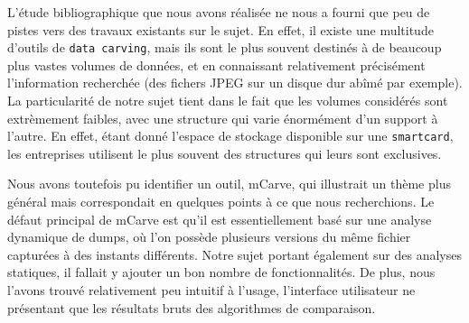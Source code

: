L'étude bibliographique que nous avons réalisée ne nous a fourni que peu de pistes vers des travaux existants sur le sujet. En effet, il existe une multitude d'outils de \texttt{data carving}, mais ils sont le plus souvent destinés à de beaucoup plus vastes volumes de données, et en connaissant relativement précisément l'information recherchée (des fichers JPEG sur un disque dur abîmé par exemple). La particularité de notre sujet tient dans le fait que les volumes considérés sont extrèmement faibles, avec une structure qui varie énormément d'un support à l'autre. En effet, étant donné l'espace de stockage disponible sur une \texttt{smartcard}, les entreprises utilisent le plus souvent des structures qui leurs sont exclusives.

Nous avons toutefois pu identifier un outil, mCarve, qui illustrait un thème plus général mais correspondait en quelques points à ce que nous recherchions. Le défaut principal de mCarve est qu'il est essentiellement basé sur une analyse dynamique de dumps, où l'on possède plusieurs versions du même fichier capturées à des instants différents. Notre sujet portant également sur des analyses statiques, il fallait y ajouter un bon nombre de fonctionnalités. De plus, nous l'avons trouvé relativement peu intuitif à l'usage, l'interface utilisateur ne présentant que les résultats bruts des algorithmes de comparaison.
